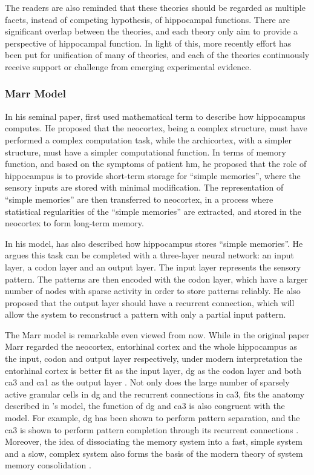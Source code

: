The readers are also reminded that these theories should be regarded as multiple facets, instead of competing hypothesis, of hippocampal functions. There are significant overlap between the theories, and each theory only aim to provide a perspective of hippocampal function. In light of this, more recently effort has been put for unification of many of theories, and each of the theories continuously receive support or challenge from emerging experimental evidence.

\subsubsection{Marr Model \label{hpc-marr}}
In his seminal paper, \citet{marr71} first used mathematical term to describe how hippocampus computes. He proposed that the neocortex, being a complex structure, must have performed a complex computation task, while the archicortex, with a simpler structure, must have a simpler computational function. In terms of memory function, and based on the symptoms of patient \gls{hm}, he proposed that the role of hippocampus is to provide short-term storage for ``simple memories'', where the sensory inputs are stored with minimal modification. The representation of ``simple memories'' are then transferred to neocortex, in a process where statistical regularities of the ``simple memories'' are extracted, and stored in the neocortex to form long-term memory. 

In his model, \citet{marr71} has also described how hippocampus stores ``simple memories''. He argues this task can be completed with a three-layer neural network: an input layer, a codon layer and an output layer. The input layer represents the sensory pattern. The patterns are then encoded with the codon layer, which have a larger number of nodes with sparse activity in order to store patterns reliably. He also proposed that the output layer should have a recurrent connection, which will allow the system to reconstruct a pattern with only a partial input pattern. 

The Marr model is remarkable even viewed from now. While in the original paper Marr \citep{marr71} regarded the neocortex, entorhinal cortex and the whole hippocampus as the input, codon and output layer respectively, under modern interpretation the entorhinal cortex is better fit as the input layer, \gls{dg} as the codon layer and both \gls{ca3} and \gls{ca1} as the output layer \citep{willshaw15}. Not only does the large number of sparsely active granular cells in \gls{dg} and the recurrent connections in \gls{ca3}, fits the anatomy described in \citet{marr71}'s model, the function of \gls{dg} and \gls{ca3} is also congruent with the model. For example, \gls{dg} has been shown to perform pattern separation, and the \gls{ca3} is shown to perform pattern completion through its recurrent connections \citep{knierim16}. Moreover, the idea of dissociating the memory system into a fast, simple system and a slow, complex system also forms the basis of the modern theory of system memory consolidation \citep{squire92, mcclelland13}. 

